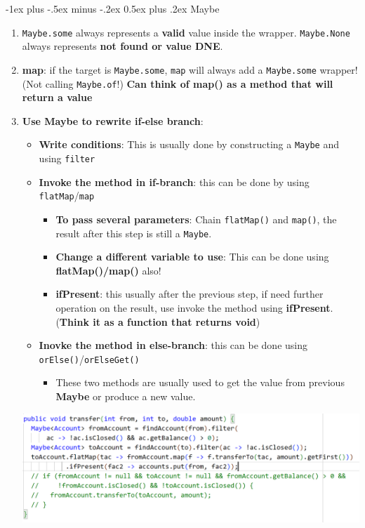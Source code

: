 \documentclass[10pt, landscape]{article}
\makeatletter
\renewcommand{\section}{\@startsection{section}{1}{0mm}%
                                {-1ex plus -.5ex minus -.2ex}%
                                {0.5ex plus .2ex}%
                                {\normalfont\large\bfseries}}
\makeatother
\begin{document}
\begin{multicols}{4}
\section{Maybe}
\begin{enumerate}
    \item \texttt{Maybe.some} always represents a \textbf{valid} value inside the wrapper. \texttt{Maybe.None} always represents \textbf{not found or value DNE}.
    \item \textbf{map}: if the target is \texttt{Maybe.some}, \texttt{map} will always add a \texttt{Maybe.some} wrapper! (Not calling \texttt{Maybe.of}!) \textbf{Can think of map() as a method that will return a value}
    \item \textbf{Use Maybe to rewrite if-else branch}:
    \begin{itemize}
        \item \textbf{Write conditions}: This is usually done by constructing a \texttt{Maybe} and using \texttt{filter}
        \item \textbf{Invoke the method in if-branch}: this can be done by using \texttt{flatMap}/\texttt{map}
        \begin{itemize}
            \item \textbf{To pass several parameters}: Chain \texttt{flatMap()} and \texttt{map()}, the result after this step is still a \texttt{Maybe}.
            \item \textbf{Change a different variable to use}: This can be done using \textbf{flatMap()/map()} also!
            \item \textbf{ifPresent}: this usually after the previous step, if need further operation on the result, use invoke the method using \textbf{ifPresent}. (\textbf{Think it as a function that returns void})
        \end{itemize}
        \item \textbf{Inovke the method in else-branch}: this can be done using \texttt{orElse()}/\texttt{orElseGet()}
        \begin{itemize}
            \item These two methods are usually used to get the value from previous \textbf{Maybe} or produce a new value.
        \end{itemize}
    \end{itemize}
    \includegraphics[width=1\linewidth]{PE/PE2/images/3.png}

\end{enumerate}
\end{multicols}
\end{document}

